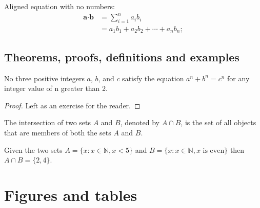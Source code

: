 Aligned equation with no numbers:
\begin{align*} %
	\label{eq:dot product}
	\textbf{a} \cdot \textbf{b} &= \sum_{i=1}^n a_ib_i \\
	&= a_1b_1 + a_2b_2 + \cdots + a_nb_n;
\end{align*}

\subsection{Theorems, proofs, definitions and examples}

\begin{theorem}
No three positive integers $a$, $b$, and $c$ satisfy the equation $a^n + b^n = c^n$ for any integer value of n greater than 2.
\end{theorem}

\begin{proof}
Left as an exercise for the reader.
\end{proof}

\begin{definition}
The intersection of two sets $A$ and $B$, denoted by $A \cap B$, is the set of all objects that are members of both the sets $A$ and $B$.
\end{definition}

\begin{example}
Given the two sets $A = \{x:x\in \mathbb{N}, x < 5\}$ and $B = \{x:x \in \mathbb{N}, x \text{ is even}\}$ then $A \cap B = \{2, 4\}$.
\end{example}


\section{Figures and tables}

